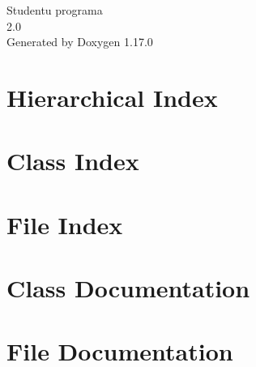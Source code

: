 \documentclass[twoside]{book}
\newcommand{\+}{\discretionary{\mbox{\scriptsize$\hookleftarrow$}}{}{}}
\newcommand{\clearemptydoublepage}{%
    \newpage{\pagestyle{empty}\cleardoublepage}%
  }
\begin{document}
  \raggedbottom
    \hypersetup{pageanchor=false,
                bookmarksnumbered=true,
                pdfencoding=unicode
               }
  \begin{titlepage}
  \vspace*{7cm}
  \begin{center}%
  {\Large Studentu programa}\\
  [1ex]\large 2.\+0 \\
  \vspace*{1cm}
  {\large Generated by Doxygen 1.17.0}\\
  \end{center}
  \end{titlepage}
  \clearemptydoublepage
  \tableofcontents
  \clearemptydoublepage
  \hypersetup{pageanchor=true}
\chapter{Hierarchical Index}

\chapter{Class Index}

\chapter{File Index}

\chapter{Class Documentation}


\chapter{File Documentation}









  \backmatter
  \newpage
  \clearemptydoublepage
  \printindex
\end{document}
